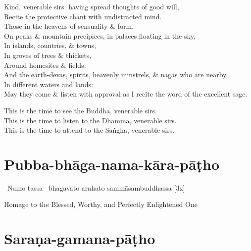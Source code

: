 \begin{leader-pharitvana}
  Kind, venerable sirs: having spread thoughts of good will,\\
  Recite the protective chant with undistracted mind.\\
  Those in the heavens of sensuality \& form,\\
  On peaks \& mountain precipices, in palaces floating in the sky,\\
  In islands, countries, \& towns,\\
  In groves of trees \& thickets,\\
  Around homesites \& fields.\\
  And the earth-devas, spirits, heavenly minstrels, \& nāgas who are nearby,\\
  In different waters and lands:\\
  May they come \& listen with approval as I recite the word of the excellent sage.

  This is the time to see the Buddha, venerable sirs.\\
  This is the time to listen to the Dhamma, venerable sirs.\\
  This is the time to attend to the Saṅgha, venerable sirs.
\end{leader-pharitvana}

\suttaRef{[Thai]}

\section{Pubba-bhāga-nama-kāra-pāṭho}
\label{pubba-bhaga-nama-kara-patho-protective}


\begin{pali-hangtogether}
  \anglebracketleft\ \hspace{-0.5mm}Namo tassa \hspace{-0.5mm}\anglebracketright\ bhagavato arahato sammāsambuddhassa \hfill{[3x]}
\end{pali-hangtogether}

\begin{english}
  Homage to the Blessed, Worthy, and Perfectly Enlightened One
\end{english}

\suttaRef{[DN 21]}

\section{Saraṇa-gamana-pāṭho}
\label{sarana-gamana-patho}


